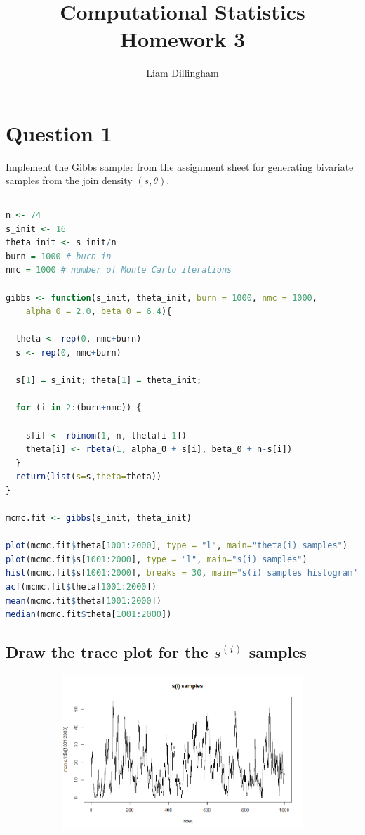 \documentclass[20pt]{article} %
\title{Computational Statistics Homework 3}
\author{Liam Dillingham}
\begin{document}
\maketitle

\section{Question 1} 
Implement the Gibbs sampler from the assignment sheet for generating bivariate samples from the join density $(s, \theta)$. 
\noindent\rule{2cm}{0.4pt} 
\begin{lstlisting}[language=R]
n <- 74
s_init <- 16
theta_init <- s_init/n
burn = 1000 # burn-in
nmc = 1000 # number of Monte Carlo iterations

gibbs <- function(s_init, theta_init, burn = 1000, nmc = 1000, 
	alpha_0 = 2.0, beta_0 = 6.4){
  
  theta <- rep(0, nmc+burn)
  s <- rep(0, nmc+burn)
  
  s[1] = s_init; theta[1] = theta_init; 
  
  for (i in 2:(burn+nmc)) {
    
    s[i] <- rbinom(1, n, theta[i-1])
    theta[i] <- rbeta(1, alpha_0 + s[i], beta_0 + n-s[i])
  }
  return(list(s=s,theta=theta))
}

mcmc.fit <- gibbs(s_init, theta_init)

plot(mcmc.fit$theta[1001:2000], type = "l", main="theta(i) samples")
plot(mcmc.fit$s[1001:2000], type = "l", main="s(i) samples")
hist(mcmc.fit$s[1001:2000], breaks = 30, main="s(i) samples histogram", freq = F)
acf(mcmc.fit$theta[1001:2000])
mean(mcmc.fit$theta[1001:2000])
median(mcmc.fit$theta[1001:2000])
\end{lstlisting}

\subsection{Draw the trace plot for the $s^{(i)}$ samples}
\begin{figure}[!htbp]
  	\centering
   	\begin{subfigure}[p]{0.9\linewidth}
    	\includegraphics[width=\linewidth]{./figures/hw3-01.png}
   	\end{subfigure}
\end{figure} 
\newpage
\end{document}

